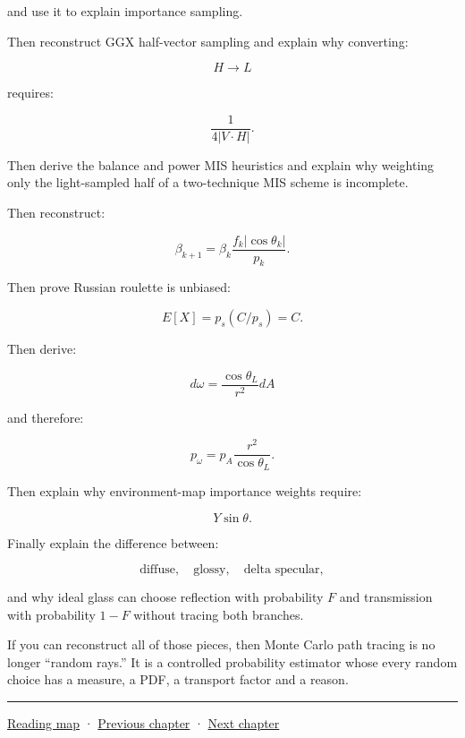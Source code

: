 and use it to explain importance sampling.

Then reconstruct GGX half-vector sampling and explain why converting:

\[
H\rightarrow L
\]

requires:

\[
\frac1{4|V\cdot H|}.
\]

Then derive the balance and power MIS heuristics and explain why weighting only the light-sampled half of a two-technique MIS scheme is incomplete.

Then reconstruct:

\[
\beta_{k+1}
=
\beta_k
\frac{
f_k|\cos\theta_k|
}{
p_k
}.
\]

Then prove Russian roulette is unbiased:

\[
E[X]=
p_s(C/p_s)=C.
\]

Then derive:

\[
d\omega
=
\frac{
\cos\theta_L
}{
r^2
}
dA
\]

and therefore:

\[
p_\omega
=
p_A
\frac{
r^2
}{
\cos\theta_L
}.
\]

Then explain why environment-map importance weights require:

\[
Y\sin\theta.
\]

Finally explain the difference between:

\[
\text{diffuse},
\quad
\text{glossy},
\quad
\text{delta specular},
\]

and why ideal glass can choose reflection with probability \(F\) and transmission with probability \(1-F\) without tracing both branches.

If you can reconstruct all of those pieces, then Monte Carlo path tracing is no longer ``random rays.'' It is a controlled probability estimator whose every random choice has a measure, a PDF, a transport factor and a reason.

\begin{center}\rule{0.5\linewidth}{0.5pt}\end{center}

\hyperref[volume-reading-map]{Reading map} · \hyperref[03-visual-computing-i-ch008-sampling-directions-and-light-transport]{Previous chapter} · \hyperref[03-visual-computing-i-ch010-a-production-path-tracer-media-randomness-and-validation]{Next chapter}
